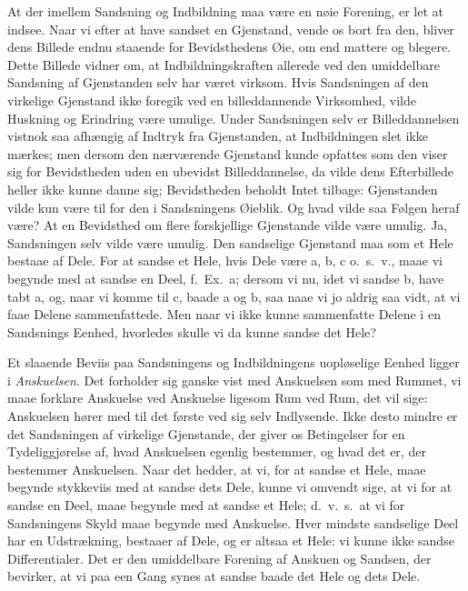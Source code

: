 \documentclass[12pt]{book}
\newcommand{\apage}[1]{\marginnote{\footnotesize\textit{[#1]}}}
\begin{document}
At der imellem Sandsning og Indbildning maa være en nøie Forening, er let
at indsee. Naar vi efter at have sandset en Gjenstand, vende os bort fra
den, bliver dens Billede endnu staaende for Bevidsthedens Øie, om end
mattere og blegere. Dette Billede vidner om, at Indbildningskraften
allerede ved den umiddelbare \apage{20} Sandsning af Gjenstanden selv har været
virksom. Hvis Sandsningen af den virkelige Gjenstand ikke foregik ved en
billeddannende Virksomhed, vilde Huskning og Erindring være umulige.
Under Sandsningen selv er Billeddannelsen vistnok saa afhængig af Indtryk
fra Gjenstanden, at Indbildningen slet ikke mærkes; men dersom den
nærværende Gjenstand kunde opfattes som den viser sig for Bevidstheden
uden en ubevidst Billeddannelse, da vilde dens Efterbillede heller ikke
kunne danne sig; Bevidstheden beholdt Intet tilbage: Gjenstanden vilde
kun være til for den i Sandsningens Øieblik. Og hvad vilde saa Følgen
heraf være? At en Bevidsthed om flere forskjellige Gjenstande vilde være
umulig. Ja, Sandsningen selv vilde være umulig. Den sandselige Gjenstand
maa som et Hele bestaae af Dele. For at sandse et Hele, hvis Dele være a,
b, c o.\ s.\ v., maae vi begynde med at sandse en Deel, f.\ Ex.\ a; dersom vi
nu, idet vi sandse b, have tabt a, og, naar vi komme til c, baade a og b,
saa naae vi jo aldrig saa vidt, at vi faae Delene sammenfattede. Men naar
vi ikke kunne sammenfatte Delene i en Sandsnings Eenhed, hvorledes skulle
vi da kunne sandse det Hele?

Et slaaende Beviis paa Sandsningens og Indbildningens uopløselige Eenhed
ligger i \emph{Anskuelsen}. Det forholder sig ganske vist med Anskuelsen som med
Rummet, vi maae forklare Anskuelse ved Anskuelse ligesom Rum ved Rum, det
vil sige: Anskuelsen hører med til det første ved sig selv Indlysende.
Ikke desto mindre er det Sandsningen af virkelige Gjenstande, der giver \apage{21} os
Betingelser for en Tydeliggjørelse af, hvad Anskuelsen egenlig bestemmer,
og hvad det er, der bestemmer Anskuelsen. Naar det hedder, at vi, for at
sandse et Hele, maae begynde stykkeviis med at sandse dets Dele, kunne vi
omvendt sige, at vi for at sandse en Deel, maae begynde med at sandse et
Hele; d.\ v.\ s.\ at vi for Sandsningens Skyld maae begynde med Anskuelse.
Hver mindste sandselige Deel har en Udstrækning, bestaaer af Dele, og er
altsaa et Hele: vi kunne ikke sandse Differentialer. Det er den
umiddelbare Forening af Anskuen og Sandsen, der bevirker, at vi paa een
Gang synes at sandse baade det Hele og dets Dele.
\end{document}

